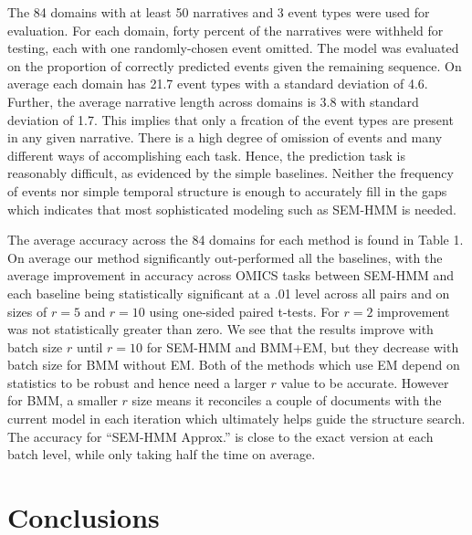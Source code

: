 \documentclass[letterpaper]{article}
\begin{document}
The 84 domains with at least 50 narratives and 3 event types were used for evaluation.
For each domain, forty percent of the narratives were withheld for testing, each with one randomly-chosen event omitted.  The model was evaluated on the proportion of correctly predicted events given the remaining sequence.
On average each domain has 21.7 event types with a standard deviation of 4.6.  Further, the average narrative length across domains is 3.8 with standard deviation of 1.7.  This implies that
only a frcation of the event types are present in any given narrative.
There is a high degree of omission of events and many different ways of accomplishing each task.
Hence, the prediction task is reasonably difficult, as evidenced by the simple baselines.
Neither the frequency of events nor simple temporal structure is enough to accurately fill in the gaps which indicates that most sophisticated modeling such as SEM-HMM is needed.

The average accuracy across the 84 domains for each method is found in Table 1.
On average our method significantly out-performed all the baselines, with the average improvement in accuracy across OMICS tasks between SEM-HMM and each baseline being statistically significant at a .01 level across all pairs and on sizes of $r = 5$ and $r= 10$ using one-sided paired t-tests.  For $r=2$ improvement was not statistically greater than zero. %
We see that the results improve with batch size $r$ until $r=10$ for
SEM-HMM and BMM+EM, but they decrease with batch size for BMM without EM.
Both of the methods which use EM depend on statistics to be robust and hence need a larger $r$ value to be accurate.  However for BMM, a smaller $r$ size means it reconciles a couple of documents with the current model in each iteration which ultimately helps guide the structure search.
The accuracy for ``SEM-HMM Approx.'' is close to the exact version at each batch level, while only taking half the time on average.




\vspace{-0.80mm}
\vspace{-1.43mm}
\section{Conclusions}
\end{document}
